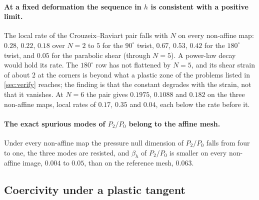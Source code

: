 \documentclass{article}
\theoremstyle{definition}
\theoremstyle{plain}
\begin{document}
\paragraph{At a fixed deformation the sequence in $h$ is consistent with a
positive limit.} The local rate of the Crouzeix--Raviart pair falls with
$N$ on every non-affine map: $0.28$, $0.22$, $0.18$ over $N = 2$ to $5$ for
the $90^\circ$ twist, $0.67$, $0.53$, $0.42$ for the $180^\circ$ twist, and
$0.05$ for the parabolic shear (through $N = 5$). A power-law decay would hold its rate. The
$180^\circ$ row has not flattened by $N = 5$, and its shear strain of about
$2$ at the corners is beyond what a plastic zone of the problems listed in
\cref{sec:verify} reaches; the finding is that the constant degrades with the strain, not that
it vanishes. At $N = 6$ the pair gives $0.1975$, $0.1088$ and $0.182$ on
the three non-affine maps, local rates of $0.17$, $0.35$ and $0.04$, each
below the rate before it.

\paragraph{The exact spurious modes of $P_2/P_0$ belong to the affine mesh.}
Under every non-affine map the pressure null dimension of $P_2/P_0$ falls
from four to one, the three modes are resisted, and $\beta_h$ of $P_2/P_0$
is smaller on every non-affine image, $0.004$ to $0.05$, than on the reference
mesh, $0.063$.

\subsection{Coercivity under a plastic tangent}
\label{sec:plastic}
\end{document}
